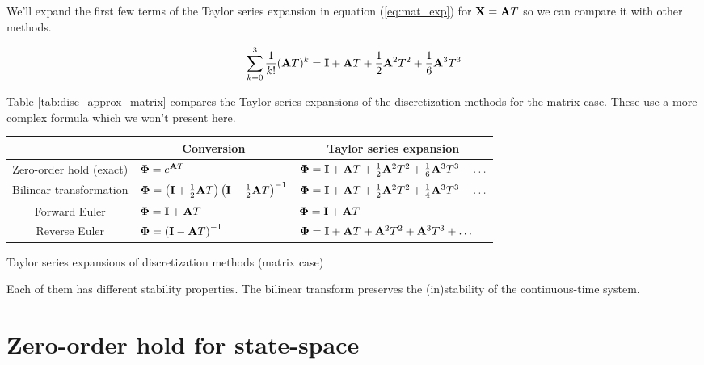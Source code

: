 We'll expand the first few terms of the Taylor series expansion in equation
(\ref{eq:mat_exp}) for $\mathbf{X} = \mathbf{A}T$ so we can compare it with other
methods.

\begin{equation*}
  \sum_{k=0}^3 \frac{1}{k!} (\mathbf{A}T)^k = \mathbf{I} + \mathbf{A}T +
    \frac{1}{2}\mathbf{A}^2T^2 + \frac{1}{6}\mathbf{A}^3T^3
\end{equation*}

Table \ref{tab:disc_approx_matrix} compares the Taylor series expansions of the
discretization methods for the matrix case. These use a more complex formula
which we won't present here.

\begin{booktable}
  \begin{tabular}{|cll|}
    \hline
    \rowcolor{headingbg}
    \multicolumn{1}{|c}{\textbf{Discretization method}} &
      \multicolumn{1}{c}{\textbf{Conversion}} &
      \multicolumn{1}{c|}{\textbf{Taylor series expansion}} \\
    \hline
    Zero-order hold (exact) &
      $\mathbf{\Phi} = e^{\mathbf{A}T}$ &
      $\mathbf{\Phi} = \mathbf{I} + \mathbf{A}T + \frac{1}{2}\mathbf{A}^2T^2 +
        \frac{1}{6}\mathbf{A}^3T^3 + \ldots$ \\
    Bilinear transformation &
      $\mathbf{\Phi} =
        \left(\mathbf{I} + \frac{1}{2}\mathbf{A}T\right)
        \left(\mathbf{I} - \frac{1}{2}\mathbf{A}T\right)^{-1}$ &
      $\mathbf{\Phi} = \mathbf{I} + \mathbf{A}T + \frac{1}{2}\mathbf{A}^2T^2 +
        \frac{1}{4}\mathbf{A}^3T^3 + \ldots$ \\
    Forward Euler &
      $\mathbf{\Phi} = \mathbf{I} + \mathbf{A}T$ &
      $\mathbf{\Phi} = \mathbf{I} + \mathbf{A}T$ \\
    Reverse Euler &
      $\mathbf{\Phi} = \left(\mathbf{I} - \mathbf{A}T\right)^{-1}$ &
      $\mathbf{\Phi} =
        \mathbf{I} + \mathbf{A}T + \mathbf{A}^2T^2 + \mathbf{A}^3T^3 + \ldots$ \\
    \hline
  \end{tabular}
  \caption{Taylor series expansions of discretization methods (matrix case)}
  \label{tab:disc_approx_matrix}
\end{booktable}

Each of them has different stability properties. The bilinear transform
preserves the (in)stability of the continuous-time system.

\section{Zero-order hold for state-space}

